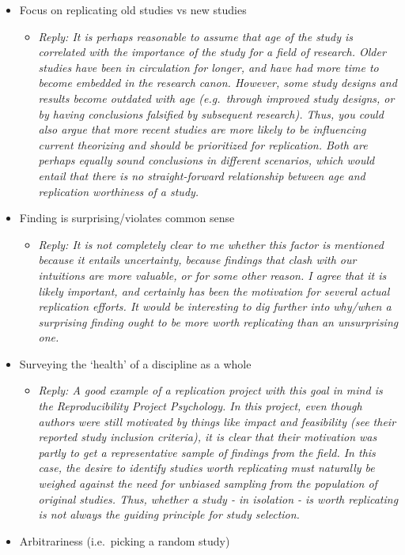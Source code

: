 \documentclass[
]{article}
\providecommand{\tightlist}{%
  \setlength{\itemsep}{0pt}\setlength{\parskip}{0pt}}
\begin{document}
\begin{itemize}
\item
  Focus on replicating old studies vs new studies

  \begin{itemize}
  \tightlist
  \item
    \emph{Reply: It is perhaps reasonable to assume that age of the
    study is correlated with the importance of the study for a field of
    research. Older studies have been in circulation for longer, and
    have had more time to become embedded in the research canon.
    However, some study designs and results become outdated with age
    (e.g.~through improved study designs, or by having conclusions
    falsified by subsequent research). Thus, you could also argue that
    more recent studies are more likely to be influencing current
    theorizing and should be prioritized for replication. Both are
    perhaps equally sound conclusions in different scenarios, which
    would entail that there is no straight-forward relationship between
    age and replication worthiness of a study. }
  \end{itemize}
\item
  Finding is surprising/violates common sense

  \begin{itemize}
  \tightlist
  \item
    \emph{Reply: It is not completely clear to me whether this factor is
    mentioned because it entails uncertainty, because findings that
    clash with our intuitions are more valuable, or for some other
    reason. I agree that it is likely important, and certainly has been
    the motivation for several actual replication efforts. It would be
    interesting to dig further into why/when a surprising finding ought
    to be more worth replicating than an unsurprising one. }
  \end{itemize}
\item
  Surveying the `health' of a discipline as a whole

  \begin{itemize}
  \tightlist
  \item
    \emph{Reply: A good example of a replication project with this goal
    in mind is the Reproducibility Project Psychology. In this project,
    even though authors were still motivated by things like impact and
    feasibility (see their reported study inclusion criteria), it is
    clear that their motivation was partly to get a representative
    sample of findings from the field. In this case, the desire to
    identify studies worth replicating must naturally be weighed against
    the need for unbiased sampling from the population of original
    studies. Thus, whether a study - in isolation - is worth replicating
    is not always the guiding principle for study selection.}
  \end{itemize}
\item
  Arbitrariness (i.e.~picking a random study)


\end{itemize}
\end{document}

